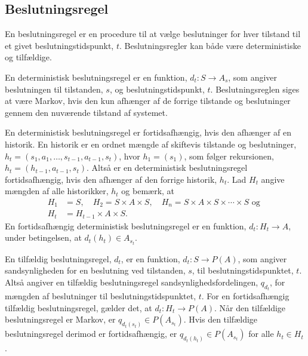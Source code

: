 


\subsection{Beslutningsregel}\label{afsnit:beslutningsregel}
En beslutningsregel er en procedure til at vælge beslutninger for hver tilstand til et givet beslutningstidspunkt, $t$. Beslutningsregler kan både være deterministiske og tilfældige.%

En deterministisk beslutningsregel er en funktion, $d_t:S\to A_s$, som angiver beslutningen til tilstanden, $s$, og beslutningstidspunkt, $t$. Beslutningsreglen siges at være Markov, hvis den kun afhænger af de forrige tilstande og beslutninger gennem den nuværende tilstand af systemet. 

En deterministisk beslutningsregel er fortidsafhængig, hvis den afhænger af en historik. En historik er en ordnet mængde af skiftevis tilstande og beslutninger, $h_t = (s_1, a_1, \dots,  s_{t-1}, a_{t-1}, s_t)$, hvor $h_1 = (s_1)$, som følger rekursionen, $h_t=(h_{t-1}, a_{t-1}, s_t)$. Altså er en deterministisk beslutningsregel fortidsafhængig, hvis den afhænger af den forrige historik, $h_t$. 
Lad $H_t$ angive mængden af alle historikker, $h_t$ og bemærk, at %
\begin{align*}
    H_1&=S, \quad H_2=S\times A\times S, \quad H_n =S\times A\times S\times \cdots \times S \text{ og }\\
    H_t&=H_{t-1}\times A\times S. 
\end{align*}
En fortidsafhængig deterministisk beslutningsregel er en funktion, $d_t: H_t\to A$, under betingelsen, at $d_t(h_t)\in A_{s_t}$.

En tilfældig beslutningsregel, $d_t$, er en funktion, $d_t: S\to P(A)$, som angiver sandsynligheden for en beslutning ved tilstanden, $s$, til beslutningstidspunktet, $t$. Altså angiver en tilfældig beslutningsregel sandsynlighedsfordelingen, $q_{d_t}$, for mængden af beslutninger til beslutningstidspunktet, $t$. For en fortidsafhængig tilfældig beslutningsregel, gælder det, at $d_t:H_t\to P(A)$. Når den tilfældige beslutningsregel er Markov, er $q_{d_t(s_t)}\in P(A_{s_t})$. Hvis den tilfældige beslutningsregel derimod er fortidsafhængig, er $q_{d_t(h_t)}\in P(A_{s_t})$ for alle $h_t\in H_t$.

